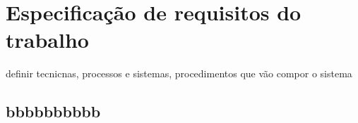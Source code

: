 \chapter{Especificação de requisitos do trabalho}

\label{CAP4}


definir tecnicnas, processos e sistemas, procedimentos que vão compor o sistema


\section{bbbbbbbbbb}


